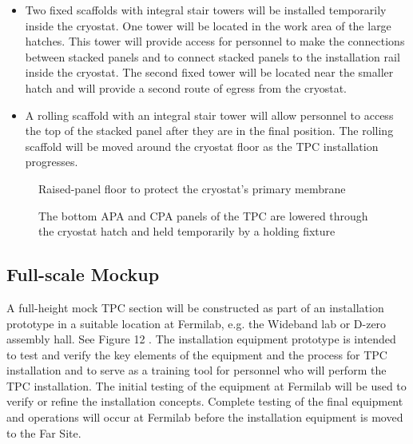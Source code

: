 \begin{itemize}
\item Two fixed scaffolds with integral stair towers will be installed temporarily inside the cryostat. One tower will be located in the work area of the large hatches. This tower will provide access for personnel to make the connections between stacked panels and to connect stacked panels to the installation rail inside the cryostat. The second fixed tower will be located near the smaller hatch and will provide a second route of egress from the cryostat. 
\item A rolling scaffold with an integral stair tower will allow personnel to access the top of the stacked panel after they are in the final position. The rolling scaffold will be moved around the cryostat floor as the TPC installation progresses. 
\end{itemize}

\begin{figure}[htbp]
\centering
\caption{Raised-panel floor to protect the cryostat's primary membrane } 
\label{fig:raised-floor-protect}
\end{figure}

\begin{figure}[htbp]
\centering
\caption[holding fixture for lowering bottom APA and CPA panels]{The bottom APA and CPA panels of the TPC are lowered through the cryostat hatch and held temporarily by a holding fixture } 
\label{fig:panels-lowered-hatch}
\end{figure}

\subsection{Full-scale Mockup}
\label{fd:install:tempeqp:fsmockup}

A full-height mock TPC section will be constructed as part of an installation prototype in a suitable location at Fermilab, e.g. the Wideband lab or D-zero assembly hall. See Figure 12 . The installation 
equipment prototype is intended to test and verify the key elements of the equipment and the process for TPC installation and to serve as a training tool for personnel who will perform the TPC installation. The initial testing of the equipment at Fermilab will be used to verify or refine the installation concepts. 
Complete testing of the final equipment and operations will occur at Fermilab before the installation equipment is moved to the Far Site. 


